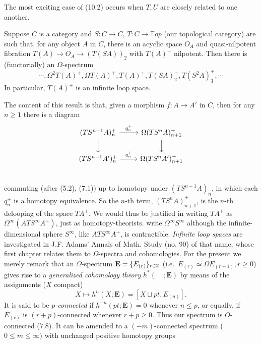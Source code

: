 The most exciting case of (10.2) occurs when $T, U$ are closely related to one another.
\begin{corollary}
  Suppose $C$ is a category and $S \colon  C \longrightarrow C$, $T \colon   C\longrightarrow \mathbb{T}op$ (our topological
category) are such that, for any object $A$ in $C$, there is an acyclic space $O_A$ and quasi-nilpotent fibration $T(A)\longrightarrow O_A \longrightarrow (T(SA))_2$ with $T(A)^+$ nilpotent. Then there is (functorially) an $\Omega$-spectrum
\[\cdots, \Omega^2 T(A)^+, \Omega T(A)^+, T(A)^+,T(SA)_2^+ ,T(S^2A)_3^+ , \cdots\]
In particular, $T(A)^+$ is an infinite loop space.
\end{corollary}
The content of this result is that, given a morphism $f\colon   A \longrightarrow A'$ in $C$, then for any $n \geqslant 1$ there is a diagram
\[
\begin{tikzcd}
 (TS^{n-1}A)_n^+ \arrow[r,"q_n^+"] \arrow[d]& \Omega (TS^nA)_{n+1}^+ \arrow[d]   \\
(TS^{n-1}A')_n^+  \arrow[r,"q_n^+"] & \Omega (TS^nA')_{n+1}^+    \\
\end{tikzcd}
\]
commuting (after (5.2), (7.1)) up to homotopy under $(TS^{n-1} A)_n$, in which each $q_n^+$ is a homotopy equivalence. So the $n$-th term, $(TS^nA)_{n+1}^+$, is the $n$-th delooping of the space $TA^+$. We would thus be justified in writing $TA^+$ as $\Omega^{\infty}(ATS^{\infty}A^+)$, just as homotopy-theorists. write $\Omega^{\infty} S^{\infty}$ although the infinite-dimensional sphere $S^{\infty}$, like $ATS^{\infty}A^+$, is contractible. {\em Infinite loop spaces} are investigated in J.F. Adams' Annals of Math. Study (no. 90) of that name, whose first chapter relates them to $\Omega$-spectra and cohomologies. For the present we merely remark that an $\Omega$-spectrum $\mathbf{E} = \{E_{(r)}\}_{r\in \mathbb{Z}}$ (i.e.\ $E_{(r)}\simeq \Omega E_{(r+1)}, r \geqslant 0$) gives rise to a {\em generalized cohomology theory} $h^*(\quad ;\mathbf{E})$ by means of the assignments ($X$ compact)
\[X\mapsto h^n(X;\mathbf{E})=[X\sqcup pt,E_{(n)}].\]
It is said to be {\em $p$-connected} if $h^{-n}(pt;\mathbf{E})=0$ whenever $n \leqslant p$, or equally, if $E_{(r)}$ is $(r+p)$-connected whenever $r+p \geqslant 0$. Thus our spectrum is $O$-connected (7.8). It can be amended to a $(-m)$-connected spectrum ($0 \leqslant m \leqslant \infty)$ with unchanged positive homotopy groups
